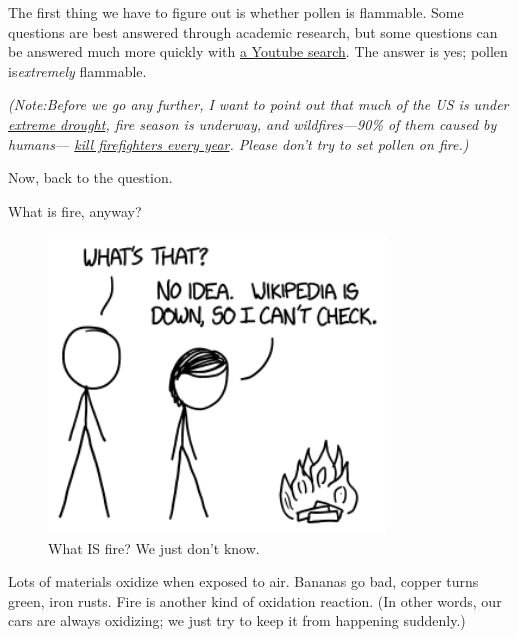 {\hfill{}

{The first thing we have to figure out is whether pollen is flammable. Some questions are best answered through academic research, but some questions can be answered much more quickly with \href{https://www.youtube.com/results?search\_query=pollen+flammable}{a Youtube search}. The answer is yes; pollen is\emph{extremely} flammable.}

{ \emph{(Note:Before we go any further, I want to point out that much of the US is under \href{http://droughtmonitor.unl.edu/}{extreme drought}, fire season is underway, and wildfires—90\% of them caused by humans— \href{http://www.nwcg.gov/pms/pubs/pms841/pms841\_all-72dpi.pdf} {kill firefighters every year}. Please don't try to set pollen on fire.)} }

{Now, back to the question.}

{What is fire, anyway?}

\begin{figure}[!htbp]
\centering
\includegraphics[scale=0.5, max width=0.8\textwidth]{imgs/a/97/hands.png}
\caption{What IS fire? We just don't know.}
\end{figure}

{Lots of materials oxidize when exposed to air. Bananas go bad, copper turns green, iron rusts. Fire is another kind of oxidation reaction. (In other words, our cars are always oxidizing; we just try to keep it from happening suddenly.)}

}
